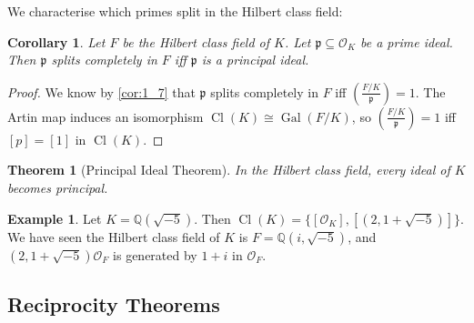 \documentclass[11pt]{article}
\theoremstyle{definition}
\newtheorem{example}[definition]{Example}
\theoremstyle{plain}
\newtheorem{theorem}[definition]{Theorem}
\newtheorem{corollary}[definition]{Corollary}
\theoremstyle{remark}
\DeclareMathOperator{\Gal}{Gal}
\DeclareMathOperator{\Cl}{Cl}
\newcommand{\QQ}{\mathbb{Q}}
\newcommand{\cO}{\mathcal{O}}
\newcommand{\fp}{\mathfrak{p}}
\newcommand{\leg}[2]{\left(\frac{#1}{#2}\right)}
\begin{document}
\noindent We characterise which primes split in the Hilbert class field:

\begin{corollary}\label{cor:4_8}
    Let $F$ be the Hilbert class field of $K$. Let $\fp \subseteq \cO_K$ be a prime ideal. Then $\fp$ splits completely in $F$ iff $\fp$ is a principal ideal.
\end{corollary}
\begin{proof}
    We know by \autoref{cor:1_7} that $\fp$ splits completely in $F$ iff $\leg{F/K}{\fp} = 1$. The Artin map induces an isomorphism $\Cl(K) \cong \Gal(F/K)$, so $\leg{F/K}{\fp} = 1$ iff $[p] = [1]$ in $\Cl(K)$.
\end{proof}

\begin{theorem}[Principal Ideal Theorem]\label{thm:4_9}
    In the Hilbert class field, every ideal of $K$ becomes principal.
\end{theorem}

\begin{example}\label{eg:4_10}
    Let $K = \QQ(\sqrt{-5})$. Then $\Cl(K) = \{[\cO_K], [(2, 1+\sqrt{-5})]\}$. We have seen the Hilbert class field of $K$ is $F = \QQ(i, \sqrt{-5})$, and $(2, 1+\sqrt{-5}) \cO_F$ is generated by $1+i$ in $\cO_F$.
\end{example}

\subsection{Reciprocity Theorems}
\end{document}

